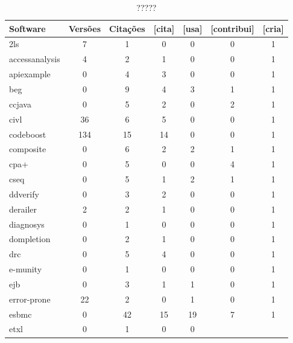 
%


\begin{table}[H]
\caption{?????}
\centering
\begin{tabular}{| l | c | c | c | c | c | c |}
  \hline
  Software & Versões & Citações & [cita] & [usa] & [contribui] & [cria] \\
  \hline
  2ls
  &
  7
  &
  1
  &
  0
  &
  0
  &
  0
  &
  1
  \\
  accessanalysis
  &
  4
  &
  2
  &
  1
  &
  0
  &
  0
  &
  1
  \\
  apiexample
  &
  0
  &
  4
  &
  3
  &
  0
  &
  0
  &
  1
  \\
  beg
  &
  0
  &
  9
  &
  4
  &
  3
  &
  1
  &
  1
  \\
  ccjava
  &
  0
  &
  5
  &
  2
  &
  0
  &
  2
  &
  1
  \\
  civl
  &
  36
  &
  6
  &
  5
  &
  0
  &
  0
  &
  1
  \\
  codeboost
  &
  134
  &
  15
  &
  14
  &
  0
  &
  0
  &
  1
  \\
  composite
  &
  0
  &
  6
  &
  2
  &
  2
  &
  1
  &
  1
  \\
  cpa+
  &
  0
  &
  5
  &
  0
  &
  0
  &
  4
  &
  1
  \\
  cseq
  &
  0
  &
  5
  &
  1
  &
  2
  &
  1
  &
  1
  \\
  ddverify
  &
  0
  &
  3
  &
  2
  &
  0
  &
  0
  &
  1
  \\
  derailer
  &
  2
  &
  2
  &
  1
  &
  0
  &
  0
  &
  1
  \\
  diagnosys
  &
  0
  &
  1
  &
  0
  &
  0
  &
  0
  &
  1
  \\
  dompletion
  &
  0
  &
  2
  &
  1
  &
  0
  &
  0
  &
  1
  \\
  drc
  &
  0
  &
  5
  &
  4
  &
  0
  &
  0
  &
  1
  \\
  e-munity
  &
  0
  &
  1
  &
  0
  &
  0
  &
  0
  &
  1
  \\
  ejb
  &
  0
  &
  3
  &
  1
  &
  1
  &
  0
  &
  1
  \\
  error-prone
  &
  22
  &
  2
  &
  0
  &
  1
  &
  0
  &
  1
  \\
  esbmc
  &
  0
  &
  42
  &
  15
  &
  19
  &
  7
  &
  1
  \\
  etxl
  &
  0
  &
  1
  &
  0
  &
  0

\end{tabular}
\end{table}
